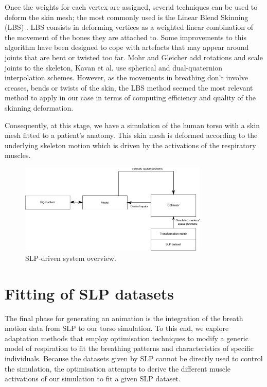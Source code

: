 Once the weights for each vertex are assigned, several techniques can be used to deform the skin mesh; the most commonly used is the Linear Blend Skinning (LBS) \cite{lewis2000pose}. LBS consists in deforming vertices as a weighted linear combination of the movement of the bones they are attached to. Some improvements to this algorithm have been designed to cope with artefacts that may appear around joints that are bent or twisted too far. Mohr and Gleicher \cite{mohr2003building} add rotations and scale joints to the skeleton, Kavan et al. \cite{kavan2007skinning} use spherical and dual-quaternion interpolation schemes. However, as the movements in breathing don't involve creases, bends or twists of the skin, the LBS method seemed the most relevant method to apply in our case in terms of computing efficiency and quality of the skinning deformation.

Consequently, at this stage, we have a simulation of the human torso with a skin mesh fitted to a patient's anatomy. This skin mesh is deformed according to the underlying skeleton motion which is driven by the activations of the respiratory muscles.

\begin{figure}
	\centering
	 \includegraphics[width=0.8\textwidth]{pics/slp_optim}
	\caption[SLP-driven system overview]{\label{fig:slp_optim}SLP-driven system overview.}
\end{figure}

\section{\label{sec:fitting}Fitting of SLP datasets}
The final phase for generating an animation is the integration of the breath motion data from SLP to our torso simulation. To this end, we explore adaptation methods that employ optimisation techniques to modify a generic model of respiration to fit the breathing patterns and characteristics of specific individuals. Because the datasets given by SLP cannot be directly used to control the simulation, the optimisation attempts to derive the different muscle activations of our simulation to fit a given SLP dataset. 

